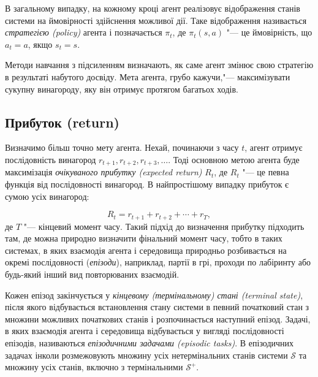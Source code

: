 В загальному випадку, на кожному кроці агент реалізовує відображення станів системи на ймовірності здійснення можливої дії. Таке відображення називається \emph{стратегією (policy)} агента і позначається $\pi_t$, де $\pi_t(s,a)$ "--- це ймовірність, що $a_t=a$, якщо $s_t = s$.

Методи навчання з підсиленням визначають, як саме агент змінює свою стратегію в результаті набутого досвіду. Мета агента, грубо кажучи,"--- максимізувати сукупну винагороду, яку він отримує протягом багатьох ходів.

\subsection{Прибуток (return)}

Визначимо більш точно мету агента. Нехай, починаючи з часу $t$, агент отримує послідовність винагород $r_{t+1}, r_{t+2}, r_{t+3}, \ldots$. Тоді основною метою агента буде максимізація \emph{очікуваного прибутку (expected return)} $R_t$, де $R_t$ "--- це певна функція від послідовності винагород. В найпростішому випадку прибуток є сумою усіх винагород:

\begin{equation}
R_t = r_{t+1} + r_{t+2} + \cdots + r_T,
\end{equation}
де $T$ "--- кінцевий момент часу. Такий підхід до визначення прибутку підходить там, де можна природно визначити фінальний момент часу, тобто в таких системах, в яких взаємодія агента і середовища природньо розбивається на окремі послідовності (\emph{епізоди}), наприклад, партії в грі, проходи по лабіринту або будь-який інший вид повторюваних взаємодій.

Кожен епізод закінчується у \emph{кінцевому (термінальному) стані (terminal state)}, після якого відбувається встановлення стану системи в певний початковий стан з множини можливих початкових станів і розпочинається наступний епізод. Задачі, в яких взаємодія агента і середовища відбувається у вигляді послідовності епізодів, називаються \emph{епізодичними задачами (episodic tasks)}. В епізодичних задачах інколи розмежовують множину усіх нетермінальних станів системи $\mathcal{S}$ та множину усіх станів, включно з термінальними $\mathcal{S^+}$.

